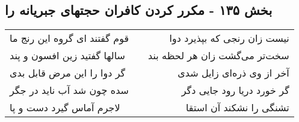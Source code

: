 \begin{center}
\section*{بخش ۱۳۵ - مکرر کردن کافران حجتهای جبریانه را}
\label{sec:sh135}
\begin{longtable}{l p{0.5cm} r}
قوم گفتند ای گروه این رنج ما
&&
نیست زان رنجی که بپذیرد دوا
\\
سالها گفتید زین افسون و پند
&&
سخت‌تر می‌گشت زان هر لحظه بند
\\
گر دوا را این مرض قابل بدی
&&
آخر از وی ذره‌ای زایل شدی
\\
سده چون شد آب ناید در جگر
&&
گر خورد دریا رود جایی دگر
\\
لاجرم آماس گیرد دست و پا
&&
تشنگی را نشکند آن استقا
\\
\end{longtable}
\end{center}
